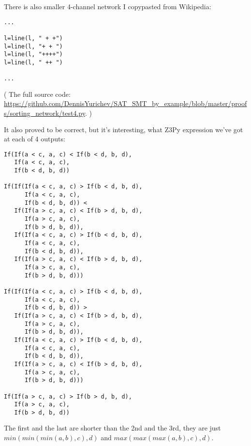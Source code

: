 There is also smaller 4-channel network I copypasted from Wikipedia:

\begin{lstlisting}
...

l=line(l, " + +")
l=line(l, "+ + ")
l=line(l, "++++")
l=line(l, " ++ ")

...
\end{lstlisting}

( The full source code: \url{https://github.com/DennisYurichev/SAT_SMT_by_example/blob/master/proofs/sorting_network/test4.py}. )

It also proved to be correct, but it's interesting, what Z3Py expression we've got at each of 4 outputs:

\begin{lstlisting}
If(If(a < c, a, c) < If(b < d, b, d),
   If(a < c, a, c),
   If(b < d, b, d))

If(If(If(a < c, a, c) > If(b < d, b, d),
      If(a < c, a, c),
      If(b < d, b, d)) <
   If(If(a > c, a, c) < If(b > d, b, d),
      If(a > c, a, c),
      If(b > d, b, d)),
   If(If(a < c, a, c) > If(b < d, b, d),
      If(a < c, a, c),
      If(b < d, b, d)),
   If(If(a > c, a, c) < If(b > d, b, d),
      If(a > c, a, c),
      If(b > d, b, d)))

If(If(If(a < c, a, c) > If(b < d, b, d),
      If(a < c, a, c),
      If(b < d, b, d)) >
   If(If(a > c, a, c) < If(b > d, b, d),
      If(a > c, a, c),
      If(b > d, b, d)),
   If(If(a < c, a, c) > If(b < d, b, d),
      If(a < c, a, c),
      If(b < d, b, d)),
   If(If(a > c, a, c) < If(b > d, b, d),
      If(a > c, a, c),
      If(b > d, b, d)))

If(If(a > c, a, c) > If(b > d, b, d),
   If(a > c, a, c),
   If(b > d, b, d))
\end{lstlisting}

The first and the last are shorter than the 2nd and the 3rd, they are just
$min(min(min(a,b),c),d)$ and 
$max(max(max(a,b),c),d)$.

